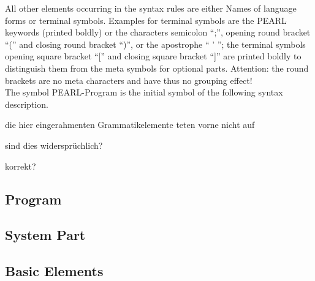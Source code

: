 All other elements occurring in the syntax rules are either Names of language
forms or terminal symbols. Examples for terminal symbols are the PEARL
keywords (printed boldly) or the characters semicolon ``;'', opening round
bracket ``('' and closing round bracket ``)'', 
or the apostrophe `` ' ''; the terminal symbols opening square bracket ``[''
and closing square bracket ``]'' are printed boldly to distinguish them
from the meta symbols for optional parts. Attention: the round brackets are
no meta characters and have thus no grouping effect!\\

The symbol PEARL-Program is the initial symbol of the following syntax
description.
\begin{discuss}
die hier eingerahmenten Grammatikelemente teten vorne nicht auf

sind dies widersprüchlich?

korrekt?
\end{discuss}
\subsection{Program}    %





\subsection{System Part}   %















\subsection{Basic Elements}    %
 





